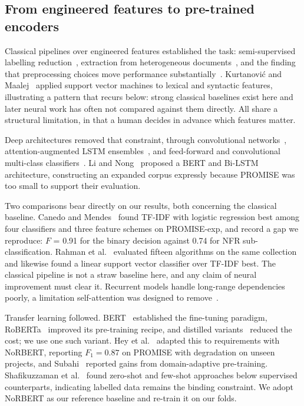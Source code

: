 \documentclass[11pt,a4paper]{article}
\begin{document}
\subsection{From engineered features to pre-trained encoders}
\label{sec:rw-methods}

Classical pipelines over engineered features established the task: semi-supervised labelling
reduction~\cite{casamayor2010}, extraction from heterogeneous documents~\cite{slankas2013}, and the
finding that preprocessing choices move performance substantially~\cite{abad2017}. Kurtanović and
Maalej~\cite{kurtanovic2017} applied support vector machines to lexical and syntactic features,
illustrating a pattern that recurs below: strong classical baselines exist here and later neural work has
often not compared against them directly. All share a structural limitation, in that a human decides in
advance which features matter.

Deep architectures removed that constraint, through convolutional
networks~\cite{winkler2016,haque2019}, attention-augmented LSTM ensembles~\cite{rahimi2021}, and
feed-forward and convolutional multi-class classifiers~\cite{baker2019}. Li and Nong~\cite{li2022}
proposed a BERT and Bi-LSTM architecture, constructing an expanded corpus expressly because PROMISE was
too small to support their evaluation.

Two comparisons bear directly on our results, both concerning the classical baseline. Canedo
and Mendes~\cite{canedo2020} found TF-IDF with logistic regression best among four classifiers
and three feature schemes on PROMISE-exp, and record a gap we reproduce: $F$ = 0.91 for the
binary decision against 0.74 for NFR sub-classification. Rahman et al.~\cite{rahman2023}
evaluated fifteen algorithms on the same collection and likewise found a linear support vector
classifier over TF-IDF best. The classical pipeline is not a straw baseline here, and any
claim of neural improvement must clear it. Recurrent models handle long-range dependencies poorly, a limitation
self-attention was designed to remove~\cite{vaswani2017}.

Transfer learning followed. BERT~\cite{devlin2019} established the fine-tuning paradigm,
RoBERTa~\cite{liu2019roberta} improved its pre-training recipe, and distilled
variants~\cite{sanh2019} reduced the cost; we use one such variant. Hey et al.~\cite{hey2020}
adapted this to requirements with NoRBERT, reporting $F_1 = 0.87$ on PROMISE with degradation
on unseen projects, and Subahi~\cite{subahi2023} reported gains from domain-adaptive
pre-training. Shafikuzzaman et al.~\cite{shafikuzzaman2025} found zero-shot and few-shot
approaches below supervised counterparts, indicating labelled data remains the binding
constraint. We adopt NoRBERT as our reference baseline and re-train it on our folds.
\end{document}

